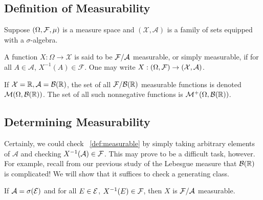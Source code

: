 \subsection{Definition of Measurability}

Suppose $(\Omega, \mathcal F, \mu)$ is a measure space and 
    $(\mathcal X, \mathcal A)$ is a family of sets equipped with 
    a $\sigma$-algebra.

\begin{definition}\label{def:measurable}
    A function $X : \Omega \to \mathcal X$ is said to be 
    $\mathcal F / \mathcal A$ measurable, or simply measurable, if for all 
    $A \in \mathcal A$, $X^{-1}(A) \in \mathcal F$. One may write 
    $X : (\Omega, \mathcal F) \to (\mathcal X, \mathcal A)$.
\end{definition}

\begin{definition}
    If $\mathcal X = \mathbb R, \mathcal A = \mathcal B(\mathbb R)$, the set of all $\mathcal F / \mathcal B(\mathbb R)$ measurable functions is 
    denoted $\mathcal M(\Omega, \mathcal B(\mathbb R))$. The set of all such nonnegative functions is 
    $\mathcal M^+(\Omega, \mathcal B(\mathbb R))$.
\end{definition}

\subsection{Determining Measurability}

Certainly, we could check ~\ref{def:measurable} by simply taking 
arbitrary elements of $\mathcal A$ and checking $X^{-1}(\mathcal A) \in \mathcal F$. 
This may prove to be a difficult task, however. For example, recall from our previous study
of the Lebesgue measure that $\mathcal B(\mathbb R)$ is complicated! We will show that 
it suffices to check a generating class.

\begin{theorem}\label{thm:measurable_sufficiency}
    If $\mathcal A = \sigma(\mathcal E)$ and for all $E \in \mathcal E$, 
    $X^{-1}(E) \in \mathcal F$, then $X$ is $\mathcal F / \mathcal A$ measurable.
\end{theorem}

